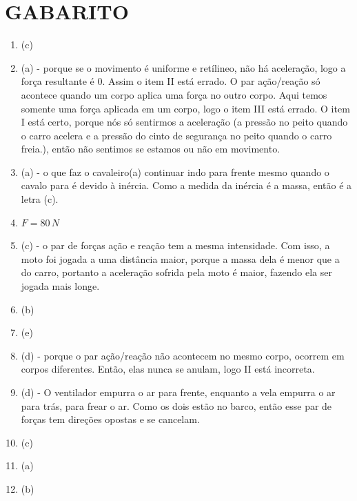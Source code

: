 \documentclass[12pt,letterpaper,fleqn]{article}
\begin{document}
\section*{GABARITO}
\begin{enumerate}
    \item (c)
    \item (a) - porque se o movimento é uniforme e retílineo, não há aceleração, logo a força resultante é 0. Assim o item II está errado. O par ação/reação só acontece quando um corpo aplica uma força no outro corpo. Aqui temos somente uma força aplicada em um corpo, logo o item III está errado. O item I está certo, porque nós só sentirmos a aceleração (a pressão no peito quando o carro acelera e a pressão do cinto de segurança no peito quando o carro freia.), então não sentimos se estamos ou não em movimento.
    
    \item (a) - o que faz o cavaleiro(a) continuar indo para frente mesmo quando o cavalo para é devido à inércia. Como a medida da inércia é a massa, então é a letra (c).
    \item $F = 80\,N$
    
    \item (c) - o par de forças ação e reação tem a mesma intensidade. Com isso, a moto foi jogada a uma distância maior, porque a massa dela é menor que a do carro, portanto a aceleração sofrida pela moto é maior, fazendo ela ser jogada mais longe.
    
    \item (b)
    
    \item (e)
    
    \item (d) - porque o par ação/reação não acontecem no mesmo corpo, ocorrem em corpos diferentes. Então, elas nunca se anulam, logo II está incorreta.
    
    \item (d) - O ventilador empurra o ar para frente, enquanto a vela empurra o ar para trás, para frear o ar. Como os dois estão no barco, então esse par de forças tem direções opostas e se cancelam. 
    
    \item (c)
    
    \item (a)
    
    \item (b)
\end{enumerate}
\end{document}
